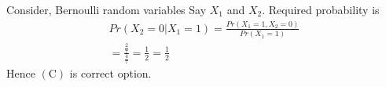 Consider, Bernoulli random variables Say $X_1$ and $X_2$. Required probability is 
\begin{align}
Pr(X_2=0|X_1=1) = \frac{Pr(X_1=1, X_2=0)}{Pr(X_1=1)}\\
= \frac{\frac{2}{7}}{\frac{4}{7}}=\frac{1}{2}
=\frac{1}{2}
\end{align}
Hence $(\mathrm{C})$ is correct option.